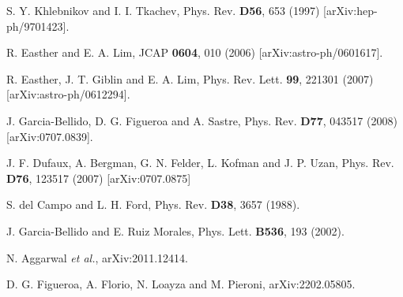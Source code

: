 \documentclass[11pt,a4paper,twoside]{book}
\begin{document}
\begin{thebibliography}{2}
	 S. Y. Khlebnikov and I. I. Tkachev, Phys. Rev. \textbf{D56}, 653 (1997) [arXiv:hep-ph/9701423].
	
	 R. Easther and E. A. Lim, JCAP \textbf{0604}, 010 (2006) [arXiv:astro-ph/0601617].
	
	 R. Easther, J. T.  Giblin and E. A. Lim, Phys. Rev. Lett. \textbf{99}, 221301 (2007)  [arXiv:astro-ph/0612294].
	
	 J. Garcia-Bellido, D. G. Figueroa and A. Sastre, Phys. Rev. \textbf{D77}, 043517 (2008) [arXiv:0707.0839].
	
	 J. F. Dufaux, A. Bergman, G. N. Felder, L. Kofman and J. P. Uzan, Phys. Rev. \textbf{D76}, 123517 (2007) [arXiv:0707.0875]
	
	 S. del Campo and L. H. Ford, Phys. Rev. \textbf{D38}, 3657 (1988).
	
	 J. Garcia-Bellido and E. Ruiz Morales, Phys. Lett. \textbf{B536}, 193 (2002).
	
	  N. Aggarwal \textit{et al.}, arXiv:2011.12414.
	
	 D. G. Figueroa, A. Florio, N. Loayza and M. Pieroni, arXiv:2202.05805.
		
	
\end{thebibliography}	
	
\end{document}

